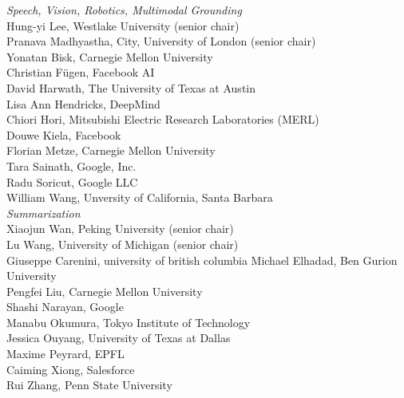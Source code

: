 \emph{Speech, Vision, Robotics, Multimodal Grounding} \\
\hspace*{0.2in} Hung-yi Lee, Westlake University (senior chair)\\
\hspace*{0.2in} Pranava Madhyastha, City, University of London (senior chair)\\
\hspace*{0.2in} Yonatan Bisk, Carnegie Mellon University\\
\hspace*{0.2in} Christian Fügen, Facebook AI\\
\hspace*{0.2in} David Harwath, The University of Texas at Austin\\
\hspace*{0.2in} Lisa Ann Hendricks, DeepMind\\
\hspace*{0.2in} Chiori Hori, Mitsubishi Electric Research Laboratories (MERL)\\
\hspace*{0.2in} Douwe Kiela, Facebook\\
\hspace*{0.2in} Florian Metze, Carnegie Mellon University\\
\hspace*{0.2in} Tara Sainath, Google, Inc.\\
\hspace*{0.2in} Radu Soricut, Google LLC\\
\hspace*{0.2in} William Wang, Unversity of California, Santa Barbara\\

\emph{Summarization} \\
\hspace*{0.2in} Xiaojun Wan, Peking University (senior chair)\\
\hspace*{0.2in} Lu Wang, University of Michigan (senior chair)\\
\hspace*{0.2in} Giuseppe Carenini, university of british columbia
\hspace*{0.2in} Michael Elhadad, Ben Gurion University\\
\hspace*{0.2in} Pengfei Liu, Carnegie Mellon University\\
\hspace*{0.2in} Shashi Narayan, Google\\
\hspace*{0.2in} Manabu Okumura, Tokyo Institute of Technology\\
\hspace*{0.2in} Jessica Ouyang, University of Texas at Dallas\\
\hspace*{0.2in} Maxime Peyrard, EPFL\\
\hspace*{0.2in} Caiming Xiong, Salesforce\\
\hspace*{0.2in} Rui Zhang, Penn State University\\

